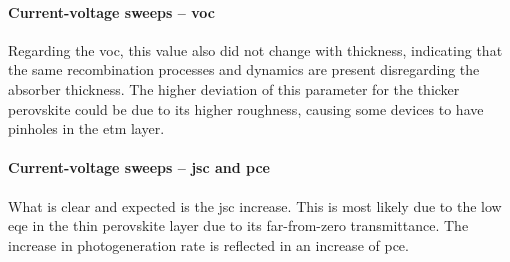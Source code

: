 \paragraph{Current-voltage sweeps -- \gls{voc}}
Regarding the \gls{voc}, this value also did not change with thickness, indicating that the same recombination processes and dynamics are present disregarding the absorber thickness.
The higher deviation of this parameter for the thicker perovskite could be due to its higher roughness, causing some devices to have pinholes in the \gls{etm} layer.

\paragraph{Current-voltage sweeps -- \gls{jsc} and \gls{pce}}
What is clear and expected is the \gls{jsc} increase.
This is most likely due to the low \gls{eqe} in the thin perovskite layer due to its far-from-zero transmittance.
The increase in photogeneration rate is reflected in an increase of \gls{pce}.

